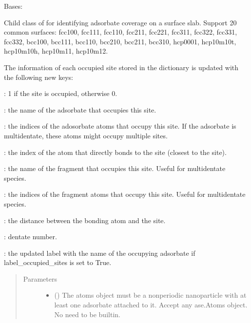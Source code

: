 \documentclass[letterpaper,10pt,english]{sphinxmanual}
\begin{document}
\begin{fulllineitems}
\label{\detokenize{modules:acat.adsorbate_coverage.SlabAdsorbateCoverage}}
Bases: 

Child class of  for identifying adsorbate
coverage on a surface slab. Support 20 common surfaces: fcc100,
fcc111, fcc110, fcc211, fcc221, fcc311, fcc322, fcc331, fcc332,
bcc100, bcc111, bcc110, bcc210, bcc211, bcc310, hcp0001,
hcp10m10t, hcp10m10h, hcp10m11, hcp10m12.

The information of each occupied site stored in the dictionary is
updated with the following new keys:

: 1 if the site is occupied, otherwise 0.

: the name of the adsorbate that occupies this site.

: the indices of the adosorbate atoms that occupy
this site. If the adsorbate is multidentate, these atoms might
occupy multiple sites.

: the index of the atom that directly bonds to the
site (closest to the site).

: the name of the fragment that occupies this site. Useful
for multidentate species.

: the indices of the fragment atoms that occupy
this site. Useful for multidentate species.

: the distance between the bonding atom and the site.

: dentate number.

: the updated label with the name of the occupying adsorbate
if label\_occupied\_sites is set to True.
\begin{quote}\begin{description}
\item[{Parameters}] \leavevmode\begin{itemize}
\item {} 
 () \textendash{} The atoms object must be a non\sphinxhyphen{}periodic nanoparticle with at
least one adsorbate attached to it. Accept any ase.Atoms object.
No need to be built\sphinxhyphen{}in.


\end{itemize}
\end{description}
\end{quote}
\end{fulllineitems}
\end{document}
